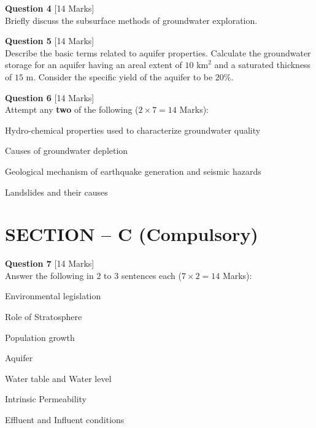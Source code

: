 \documentclass[11pt,a4paper]{article}
\begin{document}
\noindent   \textbf{Question 4} \hfill [14 Marks]\\
Briefly discuss the subsurface methods of groundwater exploration.

\bigskip




\noindent   \textbf{Question 5} \hfill [14 Marks]\\
Describe the basic terms related to aquifer properties. Calculate the groundwater storage for an aquifer having an areal extent of $10 \text{ km}^2$ and a saturated thickness of $15 \text{ m}$. Consider the specific yield of the aquifer to be $20\%$.

\bigskip




\noindent   \textbf{Question 6} \hfill [14 Marks]\\
Attempt any   \textbf{two} of the following ($2  \times 7 = 14$ Marks):

\begin{parts}
  \item Hydro-chemical properties used to characterize groundwater quality
  \item Causes of groundwater depletion
  \item Geological mechanism of earthquake generation and seismic hazards
  \item Landslides and their causes
\end{parts}

\bigskip
\section*{SECTION -- C (Compulsory)}




\noindent   \textbf{Question 7} \hfill [14 Marks]\\
Answer the following in 2 to 3 sentences each ($7  \times 2 = 14$ Marks):

\begin{parts}
  \item Environmental legislation
  \item Role of Stratosphere
  \item Population growth
  \item Aquifer
  \item Water table and Water level
  \item Intrinsic Permeability
  \item Effluent and Influent conditions
\end{parts}
\end{document}
